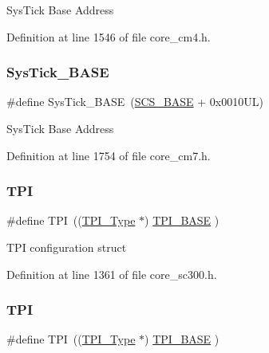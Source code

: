 Sys\+Tick Base Address 

Definition at line 1546 of file core\+\_\+cm4.\+h.

\mbox{\label{group___c_m_s_i_s__core__base_ga58effaac0b93006b756d33209e814646}} 
\subsubsection{\texorpdfstring{Sys\+Tick\+\_\+\+B\+A\+SE}{SysTick\_BASE}\hspace{0.1cm}{\footnotesize\ttfamily [7/7]}}
{\footnotesize\ttfamily \#define Sys\+Tick\+\_\+\+B\+A\+SE~(\hyperlink{group___c_m_s_i_s__core__base_ga3c14ed93192c8d9143322bbf77ebf770}{S\+C\+S\+\_\+\+B\+A\+SE} +  0x0010\+U\+L)}

Sys\+Tick Base Address 

Definition at line 1754 of file core\+\_\+cm7.\+h.

\mbox{\label{group___c_m_s_i_s__core__base_ga8b4dd00016aed25a0ea54e9a9acd1239}} 
\subsubsection{\texorpdfstring{T\+PI}{TPI}\hspace{0.1cm}{\footnotesize\ttfamily [1/4]}}
{\footnotesize\ttfamily \#define T\+PI~((\hyperlink{struct_t_p_i___type}{T\+P\+I\+\_\+\+Type}       $\ast$)     \hyperlink{group___c_m_s_i_s__core__base_ga2b1eeff850a7e418844ca847145a1a68}{T\+P\+I\+\_\+\+B\+A\+SE}      )}

T\+PI configuration struct 

Definition at line 1361 of file core\+\_\+sc300.\+h.

\mbox{\label{group___c_m_s_i_s__core__base_ga8b4dd00016aed25a0ea54e9a9acd1239}} 
\subsubsection{\texorpdfstring{T\+PI}{TPI}\hspace{0.1cm}{\footnotesize\ttfamily [2/4]}}
{\footnotesize\ttfamily \#define T\+PI~((\hyperlink{struct_t_p_i___type}{T\+P\+I\+\_\+\+Type}       $\ast$)     \hyperlink{group___c_m_s_i_s__core__base_ga2b1eeff850a7e418844ca847145a1a68}{T\+P\+I\+\_\+\+B\+A\+SE}      )}

